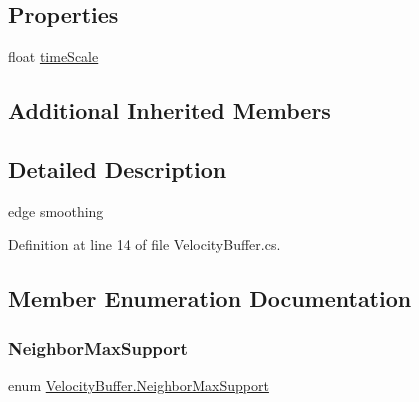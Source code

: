 \subsection*{Properties}
\begin{DoxyCompactItemize}
\item 
float \mbox{\hyperlink{class_velocity_buffer_aa49f68715d471f95a924c2072896cee2}{time\+Scale}}
\end{DoxyCompactItemize}
\subsection*{Additional Inherited Members}


\subsection{Detailed Description}
edge smoothing 



Definition at line 14 of file Velocity\+Buffer.\+cs.



\subsection{Member Enumeration Documentation}
\mbox{\label{class_velocity_buffer_a2ab38673d716b1fe0286001d9545841a}} 
\subsubsection{\texorpdfstring{Neighbor\+Max\+Support}{NeighborMaxSupport}}
{\footnotesize\ttfamily enum \mbox{\hyperlink{class_velocity_buffer_a2ab38673d716b1fe0286001d9545841a}{Velocity\+Buffer.\+Neighbor\+Max\+Support}}\hspace{0.3cm}{\ttfamily [strong]}}

